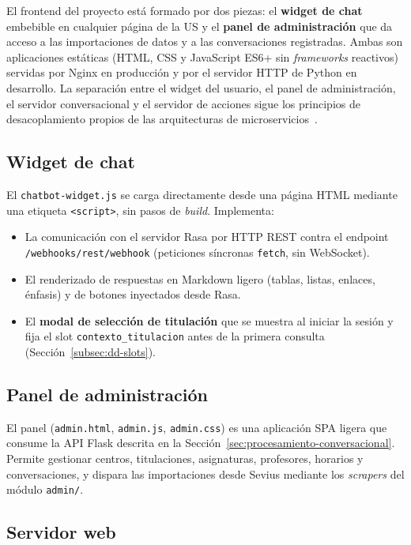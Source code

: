 El frontend del proyecto está formado por dos piezas: el \textbf{widget de chat} embebible en cualquier página de la US y el \textbf{panel de administración} que da acceso a las importaciones de datos y a las conversaciones registradas. Ambas son aplicaciones estáticas (HTML, CSS y JavaScript ES6+ sin \textit{frameworks} reactivos) servidas por Nginx en producción y por el servidor HTTP de Python en desarrollo. La separación entre el widget del usuario, el panel de administración, el servidor conversacional y el servidor de acciones sigue los principios de desacoplamiento propios de las arquitecturas de microservicios~\cite{newman2021microservices}.

\subsection{Widget de chat}

El \texttt{chatbot-widget.js} se carga directamente desde una página HTML mediante una etiqueta \texttt{<script>}, sin pasos de \textit{build}. Implementa:

\begin{itemize}
    \item La comunicación con el servidor Rasa por HTTP REST contra el endpoint \texttt{/\allowbreak webhooks/\allowbreak rest/\allowbreak webhook} (peticiones síncronas \texttt{fetch}, sin WebSocket).
    \item El renderizado de respuestas en Markdown ligero (tablas, listas, enlaces, énfasis) y de botones inyectados desde Rasa.
    \item El \textbf{modal de selección de titulación} que se muestra al iniciar la sesión y fija el slot \texttt{contexto\_titulacion} antes de la primera consulta (Sección~\ref{subsec:dd-slots}).
\end{itemize}

\subsection{Panel de administración}

El panel (\texttt{admin.html}, \texttt{admin.js}, \texttt{admin.css}) es una aplicación SPA ligera que consume la API Flask descrita en la Sección~\ref{sec:procesamiento-conversacional}. Permite gestionar centros, titulaciones, asignaturas, profesores, horarios y conversaciones, y dispara las importaciones desde Sevius mediante los \textit{scrapers} del módulo \texttt{admin/}.

\subsection{Servidor web}


